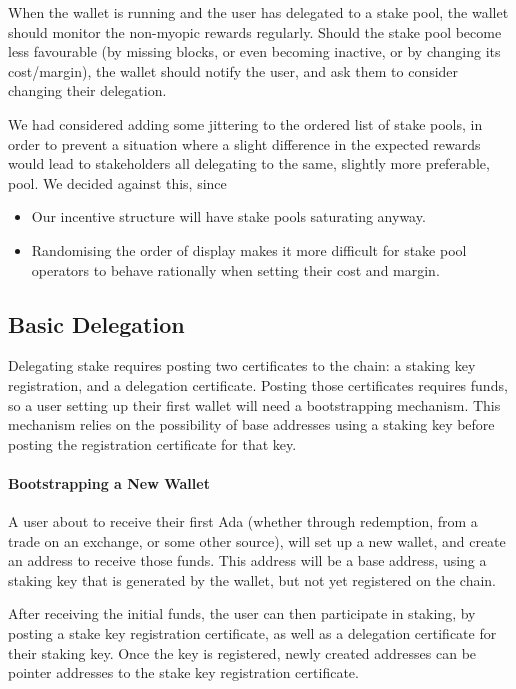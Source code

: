 \documentclass[11pt,a4paper]{article}
\begin{document}
When the wallet is running and the user has delegated to a stake pool, the
wallet should monitor the non-myopic rewards regularly. Should the stake pool
become less favourable (by missing blocks, or even becoming inactive, or by
changing its cost/margin), the wallet should notify the user, and ask them to
consider changing their delegation.

We had considered adding some jittering to the ordered list of stake pools, in
order to prevent a situation where a slight difference in the expected rewards would
lead to stakeholders all delegating to the same, slightly more preferable, pool.
We decided against this, since
\begin{itemize}
\item Our incentive structure will have stake pools saturating anyway.
\item Randomising the order of display makes it more difficult for stake pool
  operators to behave rationally when setting their cost and margin.
\end{itemize}

\subsection{Basic Delegation}
\label{basic-delegation}

Delegating stake requires posting two certificates to the chain: a
staking key registration, and a delegation certificate. Posting those
certificates requires funds, so a user setting up their first wallet
will need a bootstrapping mechanism. This mechanism relies on the
possibility of base addresses using a staking key before posting the
registration certificate for that key.

\paragraph{Bootstrapping a New Wallet}
A user about to receive their first Ada (whether through redemption,
from a trade on an exchange, or some other source), will set up a new
wallet, and create an address to receive those funds. This address
will be a base address, using a staking key that is generated by the
wallet, but not yet registered on the chain.

After receiving the initial funds, the user can then participate in
staking, by posting a stake key registration certificate, as well as a
delegation certificate for their staking key. Once the key is
registered, newly created addresses can be pointer addresses to the
stake key registration certificate.
\end{document}
